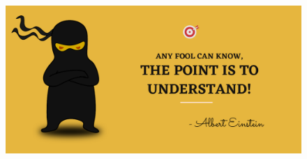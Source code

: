 \setlength{\columnsep}{3pt}
\begin{flushleft}
	\paragraph{}
	
	\bigskip
	
	\begin{figure}[h!]
		\centering
		\includegraphics[scale=.2]{content/practise.jpg}
	\end{figure}	
	

\end{flushleft}
